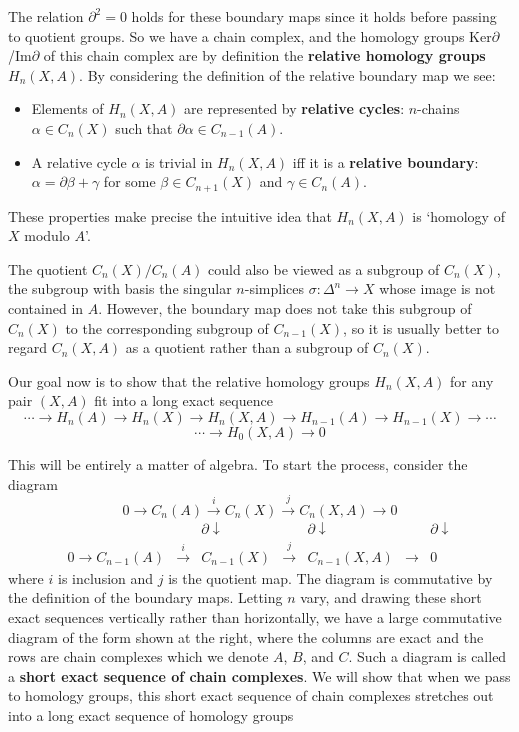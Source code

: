 The relation $\partial^2 = 0$ holds for these boundary maps since it holds before passing to
quotient groups. So we have a chain complex, and the homology groups Ker$\partial$/Im$\partial$
of this chain complex are by definition the \textbf{relative homology groups} $H_n(X,A)$. By
considering the definition of the relative boundary map we see:

\begin{itemize}
\item Elements of $H_n(X,A)$ are represented by \textbf{relative cycles}: $n$-chains $\alpha \in C_n(X)$
such that $\partial\alpha \in C_{n-1}(A)$.
\item A relative cycle $\alpha$ is trivial in $H_n(X,A)$ iff it is a \textbf{relative boundary}: $\alpha = \partial\beta + \gamma$
for some $\beta \in C_{n+1}(X)$ and $\gamma \in C_n(A)$.
\end{itemize}

These properties make precise the intuitive idea that $H_n(X,A)$ is `homology of $X$
modulo $A$'.

The quotient $C_n(X)/C_n(A)$ could also be viewed as a subgroup of $C_n(X)$, the
subgroup with basis the singular $n$-simplices $\sigma:\Delta^n \to X$ whose image is not contained in $A$. However, the boundary map does not take this subgroup of $C_n(X)$ to
the corresponding subgroup of $C_{n-1}(X)$, so it is usually better to regard $C_n(X,A)$ as
a quotient rather than a subgroup of $C_n(X)$.

Our goal now is to show that the relative homology groups $H_n(X,A)$ for any pair
$(X,A)$ fit into a long exact sequence
$$\cdots \to H_n(A) \to H_n(X) \to H_n(X,A) \to H_{n-1}(A) \to H_{n-1}(X) \to \cdots$$
$$\cdots \to H_0(X,A) \to 0$$

This will be entirely a matter of algebra. To start the process, consider the diagram
\[
0 \longrightarrow C_n(A) \xrightarrow{i} C_n(X) \xrightarrow{j} C_n(X,A) \longrightarrow 0
\]
\[
\begin{array}{ccccccc}
& & \partial \downarrow & & \partial \downarrow & & \partial \downarrow \\
0 \longrightarrow C_{n-1}(A) &\xrightarrow{i}& C_{n-1}(X) &\xrightarrow{j}& C_{n-1}(X,A) &\longrightarrow& 0
\end{array}
\]
where $i$ is inclusion and $j$ is the quotient map. The diagram is commutative by the definition of the boundary maps. Letting $n$ vary, and drawing these short exact sequences vertically rather than horizontally, we have a large commutative diagram of the form shown at the right, where the columns are exact and the rows are chain complexes which we denote $A$, $B$, and $C$. Such a diagram is called a \textbf{short exact sequence of chain complexes}. We will show that when we pass to homology groups, this short exact sequence of chain complexes stretches out into a long exact sequence of homology groups

